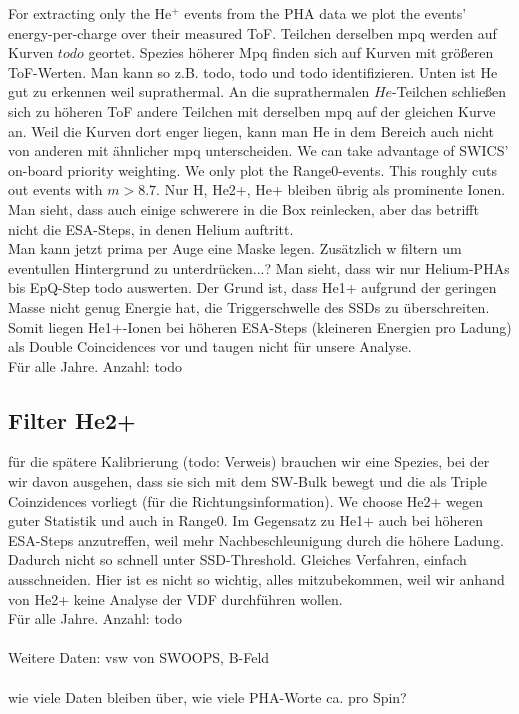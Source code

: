 For extracting only the $\mathrm{He^+}$ events from the PHA data we plot the events' energy-per-charge over their measured ToF. 
Teilchen derselben mpq werden auf Kurven $todo$ geortet. Spezies höherer Mpq finden sich auf Kurven mit größeren ToF-Werten. Man kann so z.B. todo, todo und todo identifizieren. Unten ist He gut zu erkennen weil suprathermal. An die suprathermalen $He$-Teilchen schließen sich zu höheren ToF andere Teilchen mit derselben mpq auf der gleichen Kurve an. Weil die Kurven dort enger liegen, kann man He in dem Bereich auch nicht von anderen mit ähnlicher mpq unterscheiden.
We can take advantage of SWICS' on-board priority weighting. We only plot the Range0-events. This roughly cuts out events with $m>8.7$. Nur H, He2+, He+ bleiben übrig als prominente Ionen. Man sieht, dass auch einige schwerere in die Box reinlecken, aber das betrifft nicht die ESA-Steps, in denen Helium auftritt.\\
Man kann jetzt prima per Auge eine Maske legen. Zusätzlich w filtern um eventullen Hintergrund zu unterdrücken...?
Man sieht, dass wir nur Helium-PHAs bis EpQ-Step todo auswerten. Der Grund ist, dass He1+ aufgrund der geringen Masse nicht genug Energie hat, die Triggerschwelle des SSDs zu überschreiten. Somit liegen He1+-Ionen bei höheren ESA-Steps (kleineren Energien pro Ladung) als Double Coincidences vor und taugen nicht für unsere Analyse.
\\
Für alle Jahre. Anzahl: todo


\subsection{Filter He2+}
für die spätere Kalibrierung (todo: Verweis) brauchen wir eine Spezies, bei der wir davon ausgehen, dass sie sich mit dem SW-Bulk bewegt und die als Triple Coinzidences vorliegt (für die Richtungsinformation). We choose He2+ wegen guter Statistik und auch in Range0. Im Gegensatz zu He1+ auch bei höheren ESA-Steps anzutreffen, weil mehr Nachbeschleunigung durch die höhere Ladung. Dadurch nicht so schnell unter SSD-Threshold. Gleiches Verfahren, einfach ausschneiden. Hier ist es nicht so wichtig, alles mitzubekommen, weil wir anhand von He2+ keine Analyse der VDF durchführen wollen. 
\\
Für alle Jahre. Anzahl: todo
\\ \\
Weitere Daten: vsw von SWOOPS, B-Feld
\\ \\
wie viele Daten bleiben über, wie viele PHA-Worte ca. pro Spin?


